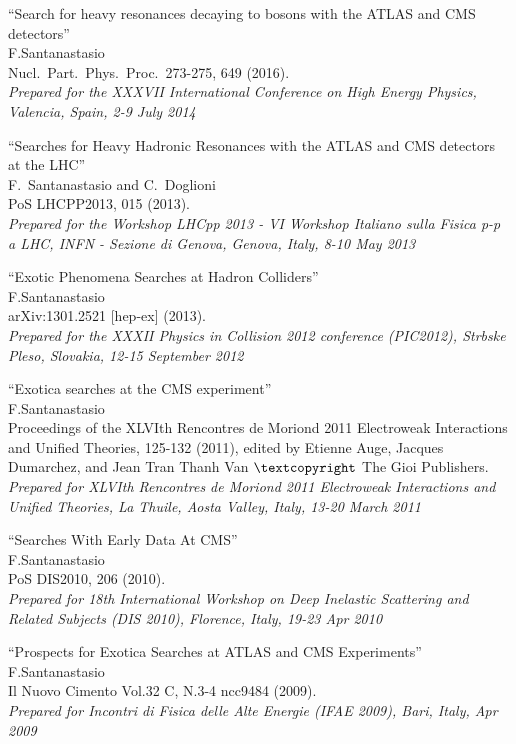 \documentclass[10pt, a4paper]{article}
\begin{document}
\begin{thebibliography}{599}
  ``Search for heavy resonances decaying to bosons with the ATLAS and
  CMS detectors''\\
 F.Santanastasio\\
  Nucl.\ Part.\ Phys.\ Proc.\  273-275, 649 (2016).\\
  {\it Prepared for the XXXVII International Conference on High Energy Physics, Valencia, Spain, 2-9 July 2014}

  ``Searches for Heavy Hadronic Resonances with the ATLAS and CMS
  detectors at the LHC''\\
F.~Santanastasio and C.~Doglioni\\
  PoS LHCPP2013, 015 (2013).\\
  {\it Prepared for the Workshop LHCpp 2013 - VI Workshop Italiano sulla Fisica p-p a LHC, INFN - Sezione di Genova, Genova, Italy, 8-10 May 2013}

  ``Exotic Phenomena Searches at Hadron Colliders''\\
 F.Santanastasio\\
  arXiv:1301.2521 [hep-ex] (2013).\\
  {\it Prepared for the XXXII Physics in Collision 2012 conference (PIC2012), Strbske Pleso, Slovakia, 12-15 September 2012}

``Exotica searches at the CMS experiment''\\
 F.Santanastasio\\
  Proceedings of the XLVIth Rencontres de Moriond 2011 Electroweak Interactions and Unified Theories, 125-132 (2011), edited by Etienne Auge, Jacques Dumarchez, and Jean Tran Thanh Van $\textcopyright$ The Gioi Publishers.\\
{\it Prepared for XLVIth Rencontres de Moriond 2011 Electroweak Interactions and Unified Theories, La Thuile, Aosta Valley, Italy, 13-20 March 2011}

``Searches With Early Data At CMS''\\
 F.Santanastasio\\
  PoS DIS2010, 206 (2010).\\
  {\it Prepared for 18th International Workshop on Deep Inelastic Scattering and Related Subjects (DIS 2010), Florence, Italy, 19-23 Apr 2010}

``Prospects for Exotica Searches at ATLAS and CMS Experiments''\\
 F.Santanastasio\\
Il Nuovo Cimento Vol.32 C, N.3-4 ncc9484 (2009).\\
{\it Prepared for Incontri di Fisica delle Alte Energie (IFAE 2009), Bari, Italy, Apr 2009}


\end{thebibliography}
\end{document}

